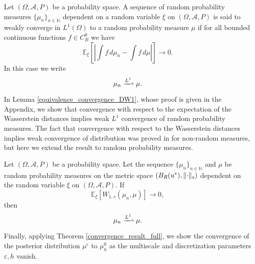 \begin{definition}
\label{weak_convergence_L1_distribution}
Let $(\Omega, \mathcal{A}, P)$ be a probability space. A sequence of random probability measures $\{ \mu_n \}_{n \in \mathbb{N}}$ dependent on a random variable $\xi$ on $(\Omega, \mathcal{A}, P)$ is said to weakly converge in $L^1(\Omega)$ to a random probability measure $\mu$ if for all bounded continuous functions $f \in C^0_B$ we have
\[ \mathbb{E}_{\xi} \left [ \left |\int f \, d \mu_n - \int f \, d \mu  \right | \right ] \to 0. \]
In this case we write
\[ \mu_n \xrightharpoonup{L^1} \mu. \]
\end{definition}

In Lemma \ref{equivalence_convergence_DW1}, whose proof is given in the Appendix, we show that convergence with respect to the expectation of the Wasserstein distances implies weak $L^1$ convergence of random probability measures. The fact that convergence with respect to the Wasserstein distances implies weak convergence of distribution was proved in \cite{San15} for non-random measures, but here we extend the result to random probability measures.

\begin{lemma}
\label{equivalence_convergence_DW1}
Let $(\Omega, \mathcal{A}, P)$ be a probability space. Let the sequence $\{ \mu_n \}_{n \in \mathbb{N}}$ and $\mu$ be random probability measures on the metric space $(B_R(u^*), \lVert\cdot\rVert_s)$ dependent on the random variable $\xi$ on $(\Omega, \mathcal{A}, P)$. If
\[ \mathbb{E}_{\xi} [W_{1,s}(\mu_n, \mu)] \to 0, \]
then
\[ \mu_n \xrightharpoonup{L^1} \mu. \]
\end{lemma}

Finally, applying Theorem \ref{convergence_result_full}, we show the convergence of the posterior distribution $\mu^{\varepsilon}$ to $\mu_h^0$ as the multiscale and discretization parameters $\varepsilon, h$ vanish.

